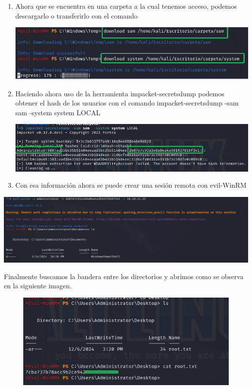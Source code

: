 \documentclass[
  letterpaper,
  DIV=11,
  numbers=noendperiod]{scrreprt}
\begin{document}
\begin{enumerate}
\def\labelenumi{\arabic{enumi})}
\setcounter{enumi}{13}
\item
  Ahora que se encuentra en una carpeta a la cual tenemos acceso,
  podemos descargarlo o transferirlo con el comando

  \includegraphics{Unidades/unidad10/imagenes/19.png}
\item
  Haciendo ahora uso de la herramienta impacket-secretsdump podemos
  obtener el hash de los usuarios con el comando impacket-secretsdump
  -sam sam -system system LOCAL

  \includegraphics{Unidades/unidad10/imagenes/20.png}
\item
  Con esa información ahora se puede crear una sesión remota con
  evil-WinRM
\end{enumerate}

\includegraphics{Unidades/unidad10/imagenes/21.png}

Finalmente buscamos la bandera entre los directorios y abrimos como se
observa en la siguiente imagen.

\begin{figure}

{\centering \includegraphics{Unidades/unidad10/imagenes/22.png}

}

\end{figure}
\end{document}
